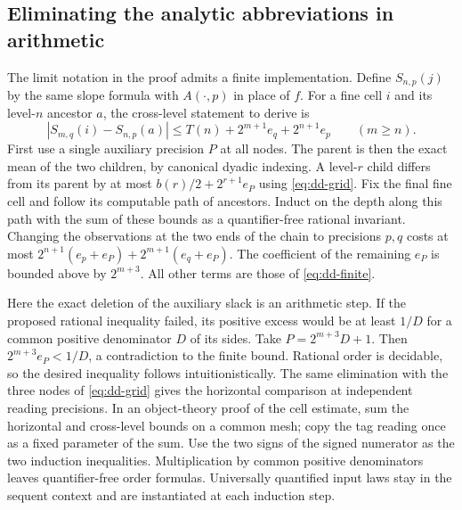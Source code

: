 \subsection{Eliminating the analytic abbreviations in arithmetic}

The limit notation in the proof admits a finite implementation. Define $S_{n,p}(j)$ by the same slope formula with $A(\cdot,p)$ in place of $f$. For a fine cell $i$ and its level-$n$ ancestor $a$, the cross-level statement to derive is
\begin{equation}
 |S_{m,q}(i)-S_{n,p}(a)|\le T(n)+2^{m+1}e_q+2^{n+1}e_p
 \qquad(m\ge n). \label{eq:dd-finite}
\end{equation}
First use a single auxiliary precision $P$ at all nodes. The parent is then the exact mean of the two children, by canonical dyadic indexing. A level-$r$ child differs from its parent by at most $b(r)/2+2^{r+1}e_P$ using \eqref{eq:dd-grid}. Fix the final fine cell and follow its computable path of ancestors. Induct on the depth along this path with the sum of these bounds as a quantifier-free rational invariant. Changing the observations at the two ends of the chain to precisions $p,q$ costs at most $2^{n+1}(e_p+e_P)+2^{m+1}(e_q+e_P)$. The coefficient of the remaining $e_P$ is bounded above by $2^{m+3}$. All other terms are those of \eqref{eq:dd-finite}.

Here the exact deletion of the auxiliary slack is an arithmetic step. If the proposed rational inequality failed, its positive excess would be at least $1/D$ for a common positive denominator $D$ of its sides. Take $P=2^{m+3}D+1$. Then $2^{m+3}e_P<1/D$, a contradiction to the finite bound. Rational order is decidable, so the desired inequality follows intuitionistically. The same elimination with the three nodes of \eqref{eq:dd-grid} gives the horizontal comparison at independent reading precisions. In an object-theory proof of the cell estimate, sum the horizontal and cross-level bounds on a common mesh; copy the tag reading once as a fixed parameter of the sum. Use the two signs of the signed numerator as the two induction inequalities. Multiplication by common positive denominators leaves quantifier-free order formulas. Universally quantified input laws stay in the sequent context and are instantiated at each induction step.

